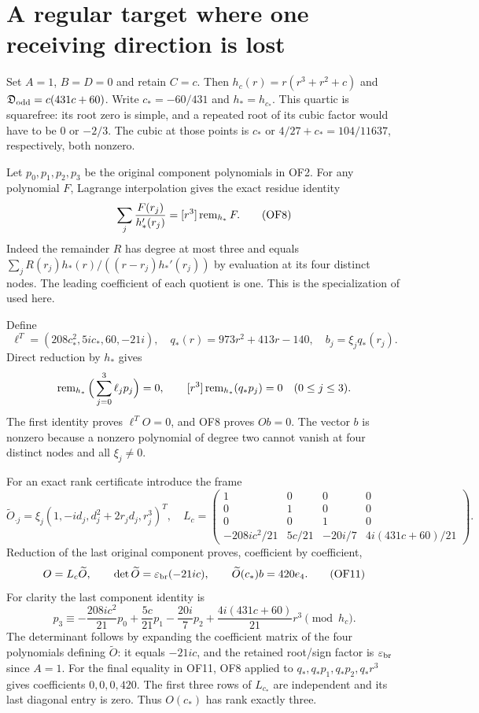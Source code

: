 \documentclass[11pt]{article}
\begin{document}
\section{A regular target where one receiving direction is lost}
Set $A=1$, $B=D=0$ and retain $C=c$. Then
$h_c(r)=r(r^3+r^2+c)$ and $\mathfrak D_{\rm odd}=c(431c+60)$.
Write $c_*=-60/431$ and $h_*=h_{c_*}$. This quartic is squarefree:
its root zero is simple, and a repeated root of its cubic factor
would have to be $0$ or $-2/3$. The cubic at those points is $c_*$
or $4/27+c_*=104/11637$, respectively, both nonzero.

Let $p_0,p_1,p_2,p_3$ be the original component polynomials in OF2.
For any polynomial $F$, Lagrange interpolation gives the exact
residue identity
\begin{equation}
 \sum_j\frac{F(r_j)}{h_*'(r_j)}=[r^3]\operatorname{rem}_{h_*}F.\tag{OF8}
\end{equation}
Indeed the remainder $R$ has degree at most three and equals
$\sum_jR(r_j)h_*(r)/((r-r_j)h_*'(r_j))$ by evaluation at its four
distinct nodes. The leading coefficient of each quotient is one.
This is the specialization of \cite[3.3.1--3.3.3\_1]{sfrepair:Temme} used here.

Define
\begin{equation}
 \ell^T=(208c_*^2,5ic_*,60,-21i),\quad
 q_*(r)=973r^2+413r-140,\quad b_j=\xi_jq_*(r_j).
 \tag{OF9}
\end{equation}
Direct reduction by $h_*$ gives
\[
 \operatorname{rem}_{h_*}\Big(\sum_{j=0}^3\ell_jp_j\Big)=0,
 \qquad [r^3]\operatorname{rem}_{h_*}(q_*p_j)=0\quad(0\le j\le3).
\]
The first identity proves $\ell^TO=0$, and OF8 proves $Ob=0$.
The vector $b$ is nonzero because a nonzero polynomial of degree two
cannot vanish at four distinct nodes and all $\xi_j\ne0$.

For an exact rank certificate introduce the frame
\begin{equation}
 \widetilde O_{\cdot j}=\xi_j(1,-id_j,d_j^2+2r_jd_j,r_j^3)^T,
 \quad
 L_c=\begin{pmatrix}
 1&0&0&0\\0&1&0&0\\0&0&1&0\\
 -208ic^2/21&5c/21&-20i/7&4i(431c+60)/21
 \end{pmatrix}.\tag{OF10}
\end{equation}
Reduction of the last original component proves, coefficient by
coefficient,
\begin{equation}
 O=L_c\widetilde O,\qquad
 \det\widetilde O=\varepsilon_{\rm br}(-21ic),\qquad
 \widetilde O(c_*)b=420e_4.\tag{OF11}
\end{equation}
For clarity the last component identity is
\[
 p_3\equiv-\frac{208ic^2}{21}p_0+\frac{5c}{21}p_1
 -\frac{20i}{7}p_2+\frac{4i(431c+60)}{21}r^3\pmod{h_c}.
\]
The determinant follows by expanding the coefficient matrix of the
four polynomials defining $\widetilde O$: it equals $-21ic$, and
the retained root/sign factor is $\varepsilon_{\rm br}$ since $A=1$.
For the final equality in OF11, OF8 applied to
$q_*,q_*p_1,q_*p_2,q_*r^3$ gives coefficients $0,0,0,420$.
The first three rows of $L_{c_*}$ are independent and its last
diagonal entry is zero. Thus $O(c_*)$ has rank exactly three.
\end{document}
